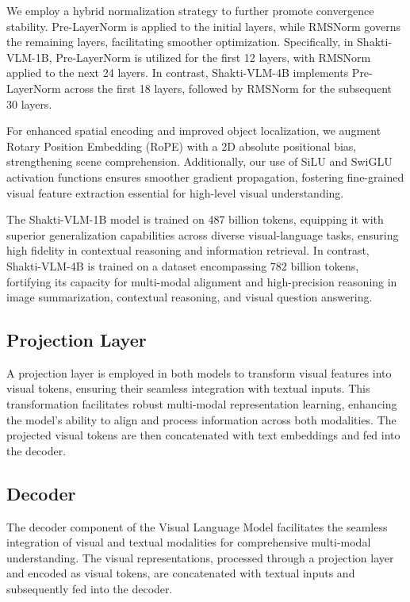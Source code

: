 \documentclass{article}
\begin{document}
We employ a hybrid normalization strategy to further promote convergence stability. Pre-LayerNorm is applied to the initial layers, while RMSNorm\cite{zhang2019rootmeansquarelayer} governs the remaining layers, facilitating smoother optimization. Specifically, in Shakti-VLM-1B, Pre-LayerNorm is utilized for the first 12 layers, with RMSNorm\cite{zhang2019rootmeansquarelayer} applied to the next 24 layers. In contrast, Shakti-VLM-4B implements Pre-LayerNorm across the first 18 layers, followed by RMSNorm\cite{zhang2019rootmeansquarelayer} for the subsequent 30 layers. 

For enhanced spatial encoding and improved object localization, we augment Rotary Position Embedding (RoPE)\cite{su2023roformerenhancedtransformerrotaryrope} with a 2D absolute positional bias, strengthening scene comprehension. Additionally, our use of SiLU\cite{elfwing2017sigmoidweightedlinearunitsneuralsilu} and SwiGLU\cite{shazeer2020gluvariantsimprovetransformerswiglu} activation functions ensures smoother gradient propagation, fostering fine-grained visual feature extraction essential for high-level visual understanding. 

The Shakti-VLM-1B model is trained on 487 billion tokens, equipping it with superior generalization capabilities across diverse visual-language tasks, ensuring high fidelity in contextual reasoning and information retrieval. In contrast, Shakti-VLM-4B is trained on a dataset encompassing 782 billion tokens, fortifying its capacity for multi-modal alignment and high-precision reasoning in image summarization, contextual reasoning, and visual question answering. 

\subsection{Projection Layer}
A projection layer is employed in both models to transform visual features into visual tokens, ensuring their seamless integration with textual inputs. This transformation facilitates robust multi-modal representation learning, enhancing the model’s ability to align and process information across both modalities. The projected visual tokens are then concatenated with text embeddings and fed into the decoder. 

\subsection{Decoder}
The decoder component of the Visual Language Model facilitates the seamless integration of visual and textual modalities for comprehensive multi-modal understanding. The visual representations, processed through a projection layer and encoded as visual tokens, are concatenated with textual inputs and subsequently fed into the decoder. 
\end{document}
